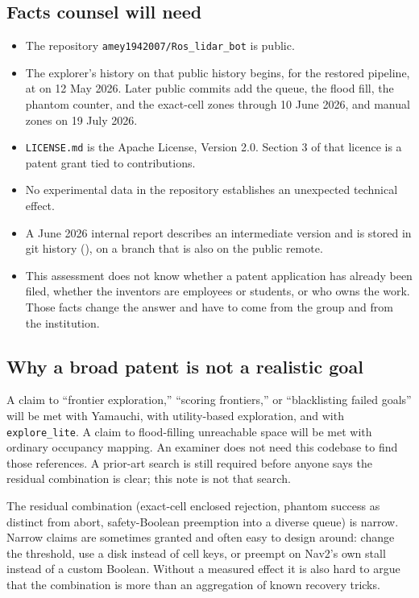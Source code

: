 \documentclass[11pt]{article}
\begin{document}
\subsection{Facts counsel will need}
\begin{itemize}
\item The repository \texttt{amey1942007/Ros\_lidar\_bot} is public.
\item The explorer's history on that public history begins, for the restored pipeline, at  on 12 May 2026. Later public commits add the queue, the flood fill, the phantom counter, and the exact-cell zones through 10 June 2026, and manual zones on 19 July 2026.
\item \texttt{LICENSE.md} is the Apache License, Version 2.0. Section 3 of that licence is a patent grant tied to contributions.
\item No experimental data in the repository establishes an unexpected technical effect.
\item A June 2026 internal report describes an intermediate version and is stored in git history (), on a branch that is also on the public remote.
\item This assessment does not know whether a patent application has already been filed, whether the inventors are employees or students, or who owns the work. Those facts change the answer and have to come from the group and from the institution.
\end{itemize}

\subsection{Why a broad patent is not a realistic goal}
A claim to ``frontier exploration,'' ``scoring frontiers,'' or ``blacklisting failed goals'' will be met with Yamauchi, with utility-based exploration, and with \texttt{explore\_lite}. A claim to flood-filling unreachable space will be met with ordinary occupancy mapping. An examiner does not need this codebase to find those references. A prior-art search is still required before anyone says the residual combination is clear; this note is not that search.

The residual combination (exact-cell enclosed rejection, phantom success as distinct from abort, safety-Boolean preemption into a diverse queue) is narrow. Narrow claims are sometimes granted and often easy to design around: change the threshold, use a disk instead of cell keys, or preempt on Nav2's own stall instead of a custom Boolean. Without a measured effect it is also hard to argue that the combination is more than an aggregation of known recovery tricks.
\end{document}
